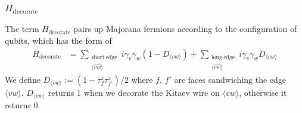 \documentclass[12pt]{article}
\numberwithin{equation}{section}
\begin{document}
    
\subsubsection{$H_{\mathrm{decorate}}$}
The term $H_{\mathrm{decorate}}$ pairs up Majorana fermions according to the configuration of qubits, which has the form of
\begin{align}
    H_{\mathrm{decorate}} &=\sum_{\substack{\mathrm{short\ edge}\\ \langle \overrightarrow{vw}\rangle}}i\gamma_v\gamma_w(1-D_{\langle vw\rangle})+\sum_{\substack{\mathrm{long\ edge}\\ \langle \overrightarrow{vw}\rangle}}i\gamma_v\gamma_wD_{\langle vw\rangle}
\end{align}
We define $D_{\langle vw\rangle}:=(1-\tau_f^z\tau_{f'}^z)/2$ where $f$, $f'$ are faces sandwiching the edge $\langle vw\rangle$.
$D_{\langle vw\rangle}$ returns 1 when we decorate the Kitaev wire on $\langle vw\rangle$, otherwise it returns 0.
\end{document}
